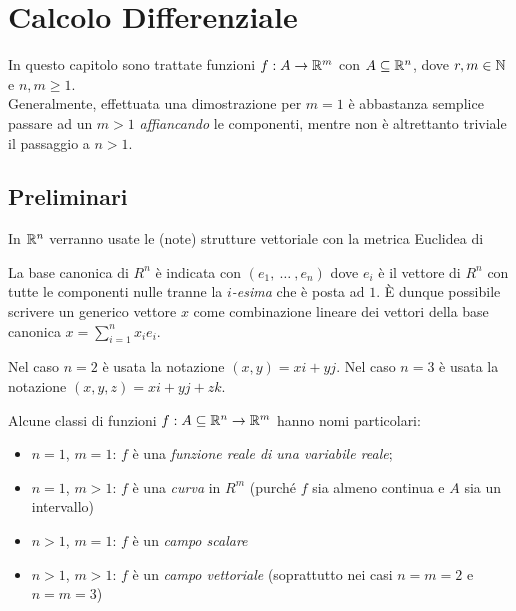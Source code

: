 \chapter{Calcolo Differenziale}

In questo capitolo sono trattate funzioni $f: A \to \mathbb{R}^m$ con $A \subseteq \mathbb{R}^n$, dove $r,m \in \mathbb{N}$ e $n,m \geq 1$.\\
Generalmente, effettuata una dimostrazione per $m = 1$ è abbastanza semplice passare ad un $m > 1$ \textit{affiancando} le componenti, mentre non è altrettanto triviale il passaggio a $n > 1$.

\section{Preliminari}
In $\mathbb{R}^n$ verranno usate le (note) strutture vettoriale con la metrica Euclidea di \hyperref[ex:dist_eucl]{} %

\vspace*{\baselineskip}
La base canonica di $R^n$ è indicata con $(e_1,\:\dotsc\:,e_n)$ dove $e_i$ è il vettore di $R^n$ con tutte le componenti nulle tranne la $i$\textit{-esima} che è posta ad $1$. È dunque possibile scrivere un generico vettore $x$ come combinazione lineare dei vettori della base canonica $x=\sum\limits_{i=1}^{n} x_i e_i$.

\vspace*{\baselineskip}
Nel caso $n=2$ è usata la notazione $(x,y)=xi+yj$. Nel caso $n=3$ è usata la notazione $(x,y,z)=xi+yj+zk$.

\vspace*{\baselineskip}
Alcune classi di funzioni $f:A\subseteq\mathbb{R}^n \to\mathbb{R}^m$ hanno nomi particolari:
\begin{itemize}
	\item $n=1$, $m=1$: $f$ è una \textit{funzione reale di una variabile reale};
	\item $n=1$, $m>1$: $f$ è una \textit{curva} in $R^m$ (purché $f$ sia almeno continua e $A$ sia un intervallo)
	\item $n>1$, $m=1$: $f$ è un \textit{campo scalare}
	\item $n>1$, $m>1$: $f$ è un \textit{campo vettoriale} (soprattutto nei casi $n=m=2$ e $n=m=3$)
\end{itemize}


